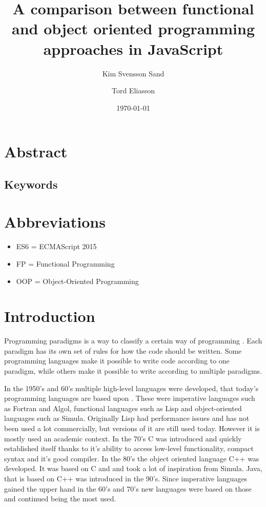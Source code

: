 \documentclass {article}
\title{A comparison between functional and object oriented programming approaches in JavaScript}
\date{\today}
\author{
Kim Svensson Sand \and Tord Eliasson
}
\begin{document}
\maketitle
{}
\newpage
\tableofcontents
\newpage
{}
\section*{Abstract}
\subsection*{Keywords}
\listoffigures
\listoftables
\section*{Abbreviations}
\begin{itemize}[leftmargin=*]
\item [ ] ES6 = ECMAScript 2015
\item [ ] FP = Functional Programming
\item [ ] OOP = Object-Oriented Programming
\end{itemize}
\section{Introduction}
Programming paradigms is a way to classify a certain way of programming \cite{programming-paradigms}. Each paradigm has its own set of rules for how the code should be written. Some programming languages make it possible to write code according to one paradigm,  while others make it possible to write according to multiple paradigms. 

In the 1950's and 60's multiple high-level languages were developed, that today's programming languages are based upon \cite{gabmar}. These were imperative languages such as Fortran and Algol, functional languages such as Lisp and object-oriented languages such as Simula. Originally Lisp had performance issues and has not been used a lot commercially, but versions of it are still used today. However it is mostly used an academic context. In the 70's C was introduced and quickly established itself thanks to it's ability to access low-level functionality, compact syntax and it's good compiler. In the 80's the object oriented language C++ was developed. It was based on C and and took a lot of inspiration from Simula. Java, that is based on C++ was introduced in the 90's. Since imperative languages gained the upper hand in the 60's and 70's new languages were based on those and continued being the most used. 
\end{document}
